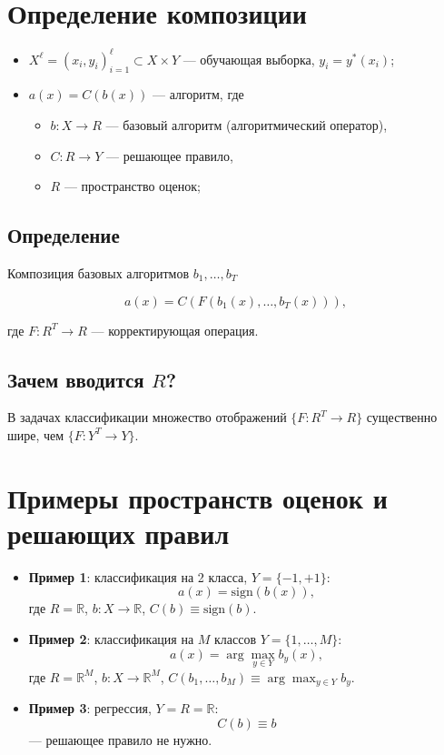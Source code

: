 \section*{Определение композиции}

\begin{itemize}
    \item $X^\ell = (x_i, y_i)_{i=1}^\ell \subset X \times Y$ — обучающая выборка, $y_i = y^*(x_i)$;
    \item $a(x) = C(b(x))$ — алгоритм, где
          \begin{itemize}
              \item $b: X \rightarrow R$ — базовый алгоритм (алгоритмический оператор),
              \item $C: R \rightarrow Y$ — решающее правило,
              \item $R$ — пространство оценок;
          \end{itemize}
\end{itemize}

\subsection*{Определение}
Композиция базовых алгоритмов $b_1, \ldots, b_T$

\[ a(x) = C(F(b_1(x), \ldots, b_T(x))), \]

где $F: R^T \rightarrow R$ — корректирующая операция.

\subsection*{Зачем вводится $R$?}
В задачах классификации множество отображений $\{F : R^T \rightarrow R\}$ существенно шире, чем $\{F : Y^T \rightarrow Y\}$.

\section*{Примеры пространств оценок и решающих правил}

\begin{itemize}
    \item \textbf{Пример 1}: классификация на 2 класса, $Y = \{-1, +1\}$:
          \[
              a(x) = \text{sign}(b(x)),
          \]
          где $R = \mathbb{R}$, $b: X \rightarrow \mathbb{R}$, $C(b) \equiv \text{sign}(b)$.

    \item \textbf{Пример 2}: классификация на $M$ классов $Y = \{1, \ldots, M\}$:
          \[
              a(x) = \arg \max_{y \in Y} b_y(x),
          \]
          где $R = \mathbb{R}^M$, $b: X \rightarrow \mathbb{R}^M$, $C(b_1, \ldots, b_M) \equiv \arg \max_{y \in Y} b_y$.

    \item \textbf{Пример 3}: регрессия, $Y = R = \mathbb{R}$:
          \[
              C(b) \equiv b
          \]
          — решающее правило не нужно.
\end{itemize}


